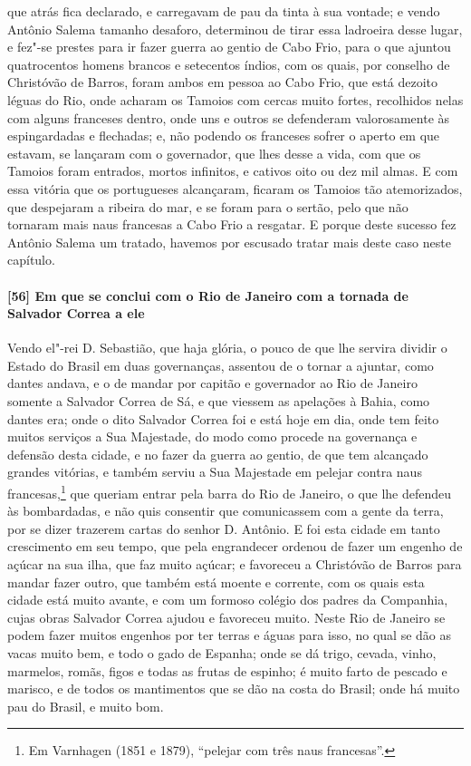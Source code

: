 que atrás fica declarado, e carregavam de pau da tinta à sua vontade; e vendo Antônio
Salema tamanho desaforo, determinou de tirar essa ladroeira desse lugar, e fez"-se prestes
para ir fazer guerra ao gentio de Cabo Frio, para o que ajuntou quatrocentos homens
brancos e setecentos índios, com os quais, por conselho de Christóvão de Barros, foram
ambos em pessoa ao Cabo Frio, que está dezoito léguas do Rio, onde acharam os Tamoios com
cercas muito fortes, recolhidos nelas com alguns franceses dentro, onde uns e outros se
defenderam valorosamente às espingardadas e flechadas; e, não podendo os franceses sofrer
o aperto em que estavam, se lançaram com o governador, que lhes desse a vida, com que os
Tamoios foram entrados, mortos infinitos, e cativos oito ou dez mil almas. E com essa
vitória que os portugueses alcançaram, ficaram os Tamoios tão atemorizados, que despejaram
a ribeira do mar, e se foram para o sertão, pelo que não tornaram mais naus francesas a
Cabo Frio a resgatar. E porque deste sucesso fez Antônio Salema um tratado, havemos por
escusado tratar mais deste caso neste capítulo.

\paragraph{[56] Em que se conclui com o Rio de Janeiro com a tornada de Salvador Correa a
ele} \quad
Vendo el"-rei D. Sebastião, que haja glória, o pouco de que lhe servira dividir o Estado do
Brasil em duas governanças, assentou de o tornar a ajuntar, como dantes andava, e o de
mandar por capitão e governador ao Rio de Janeiro somente a Salvador Correa de Sá, e que
viessem as apelações à Bahia, como dantes era; onde o dito Salvador Correa foi e está hoje
em dia, onde tem feito muitos serviços a Sua Majestade, do modo como procede na governança
e defensão desta cidade, e no fazer da guerra ao gentio, de que tem alcançado grandes
vitórias, e também serviu a Sua Majestade em pelejar contra naus francesas,\footnote{ Em
Varnhagen (1851 e 1879), ``pelejar com três naus francesas''.} que queriam entrar pela
barra do Rio de Janeiro, o que lhe defendeu às bombardadas, e não quis consentir que
comunicassem com a gente da terra, por se dizer trazerem cartas do senhor D. Antônio. E
foi esta cidade em tanto crescimento em seu tempo, que pela engrandecer ordenou de fazer
um engenho de açúcar na sua ilha, que faz muito açúcar; e favoreceu a Christóvão de Barros
para mandar fazer outro, que também está moente e corrente, com os quais esta cidade está
muito avante, e com um formoso colégio dos padres da Companhia, cujas obras Salvador
Correa ajudou e favoreceu muito. Neste Rio de Janeiro se podem fazer muitos engenhos por
ter terras e águas para isso, no qual se dão as vacas muito bem, e todo o gado de Espanha;
onde se dá trigo, cevada, vinho, marmelos, romãs, figos e todas as frutas de espinho; é
muito farto de pescado e marisco, e de todos os mantimentos que se dão na costa do Brasil;
onde há muito pau do Brasil, e muito bom.

